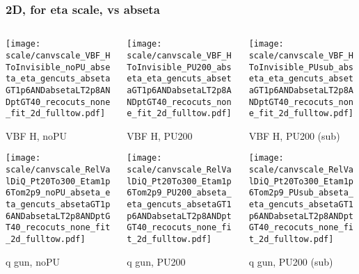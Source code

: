 \documentclass[8pt]{beamer}
\begin{document}
   \begin{frame}
  \frametitle{2D, for eta scale, vs abseta}
  
  \begin{columns}
   \begin{column}{0.35\textwidth}
     \texttt{[image: scale/canvscale\_VBF\_HToInvisible\_noPU\_abseta\_eta\_gencuts\_absetaGT1p6ANDabsetaLT2p8ANDptGT40\_recocuts\_none\_fit\_2d\_fulltow.pdf]}
     
     VBF H, noPU
    
     \texttt{[image: scale/canvscale\_RelValDiQ\_Pt20To300\_Etam1p6Tom2p9\_noPU\_abseta\_eta\_gencuts\_absetaGT1p6ANDabsetaLT2p8ANDptGT40\_recocuts\_none\_fit\_2d\_fulltow.pdf]}
     
     q gun, noPU
   \end{column}
   \begin{column}{0.35\textwidth}
     \texttt{[image: scale/canvscale\_VBF\_HToInvisible\_PU200\_abseta\_eta\_gencuts\_absetaGT1p6ANDabsetaLT2p8ANDptGT40\_recocuts\_none\_fit\_2d\_fulltow.pdf]}
     
     VBF H, PU200
    
     \texttt{[image: scale/canvscale\_RelValDiQ\_Pt20To300\_Etam1p6Tom2p9\_PU200\_abseta\_eta\_gencuts\_absetaGT1p6ANDabsetaLT2p8ANDptGT40\_recocuts\_none\_fit\_2d\_fulltow.pdf]}
     
     q gun, PU200
   \end{column}
   \begin{column}{0.35\textwidth}
     \texttt{[image: scale/canvscale\_VBF\_HToInvisible\_PUsub\_abseta\_eta\_gencuts\_absetaGT1p6ANDabsetaLT2p8ANDptGT40\_recocuts\_none\_fit\_2d\_fulltow.pdf]}
     
     VBF H, PU200 (sub)
    
     \texttt{[image: scale/canvscale\_RelValDiQ\_Pt20To300\_Etam1p6Tom2p9\_PUsub\_abseta\_eta\_gencuts\_absetaGT1p6ANDabsetaLT2p8ANDptGT40\_recocuts\_none\_fit\_2d\_fulltow.pdf]}
     
     q gun, PU200 (sub)
   \end{column}
  \end{columns}
 \end{frame}
 
\end{document}
